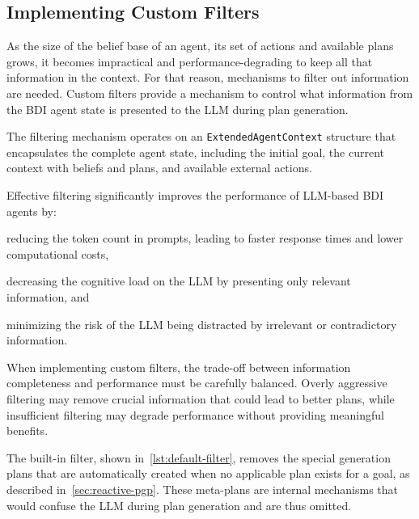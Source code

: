 \documentclass[12pt,a4paper,openright,twoside]{book}
\begin{document}
\subsection{Implementing Custom Filters}\label{sec:custom-filters}

As the size of the belief base of an agent, its set of actions and available plans grows, it becomes impractical and performance-degrading to keep all that information in the context. 
%
For that reason, mechanisms to filter out information are needed.
%
Custom filters provide a mechanism to control what information from the \ac{BDI} agent state is presented to the \ac{LLM} during plan generation. 

The filtering mechanism operates on an \texttt{ExtendedAgentContext} structure that encapsulates the complete agent state, including the initial goal, the current context with beliefs and plans, and available external actions.

Effective filtering significantly improves the performance of \ac{LLM}-based \ac{BDI} agents by:
%
\begin{inlinelist}
    \item reducing the token count in prompts, leading to faster response times and lower computational costs,
    \item decreasing the cognitive load on the \ac{LLM} by presenting only relevant information, and
    \item minimizing the risk of the \ac{LLM} being distracted by irrelevant or contradictory information.
\end{inlinelist}

When implementing custom filters, the trade-off between information completeness and performance must be carefully balanced. 
%
Overly aggressive filtering may remove crucial information that could lead to better plans, while insufficient filtering may degrade performance without providing meaningful benefits.



The built-in filter, shown in~\cref{lst:default-filter}, removes the special generation plans that are automatically created when no applicable plan exists for a goal, as described in~\cref{sec:reactive-pgp}. 
%
These meta-plans are internal mechanisms that would confuse the \ac{LLM} during plan generation and are thus omitted.
\end{document}
